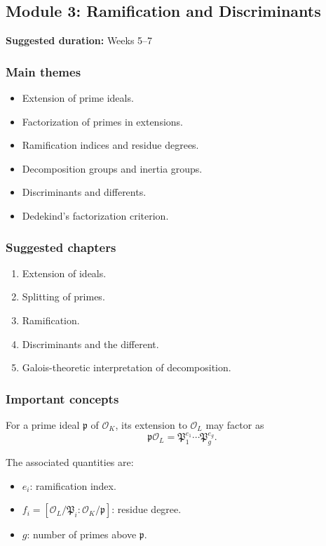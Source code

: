\documentclass[11pt]{article}
\begin{document}
\subsection{Module 3: Ramification and Discriminants}

\textbf{Suggested duration:} Weeks 5--7

\subsubsection*{Main themes}

\begin{itemize}
    \item Extension of prime ideals.
    \item Factorization of primes in extensions.
    \item Ramification indices and residue degrees.
    \item Decomposition groups and inertia groups.
    \item Discriminants and differents.
    \item Dedekind's factorization criterion.
\end{itemize}

\subsubsection*{Suggested chapters}

\begin{enumerate}
    \item Extension of ideals.
    \item Splitting of primes.
    \item Ramification.
    \item Discriminants and the different.
    \item Galois-theoretic interpretation of decomposition.
\end{enumerate}

\subsubsection*{Important concepts}

For a prime ideal \(\mathfrak{p}\) of \(\mathcal{O}_K\), its extension to
\(\mathcal{O}_L\) may factor as
\[
    \mathfrak{p}\mathcal{O}_L
    =
    \mathfrak{P}_1^{e_1}\cdots\mathfrak{P}_g^{e_g}.
\]

The associated quantities are:

\begin{itemize}
    \item \(e_i\): ramification index.
    \item \(f_i=[\mathcal{O}_L/\mathfrak{P}_i:
          \mathcal{O}_K/\mathfrak{p}]\): residue degree.
    \item \(g\): number of primes above \(\mathfrak{p}\).
\end{itemize}
\end{document}
